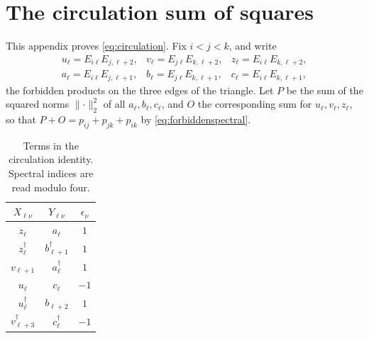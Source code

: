 \documentclass[aps,prl,reprint,superscriptaddress,longbibliography,floatfix,raggedbottom]{revtex4-2}
\newcommand{\norm}[1]{\lVert #1\rVert}
\begin{document}
\section{The circulation sum of squares}\label{app:circulation}

This appendix proves \eqref{eq:circulation}. Fix $i<j<k$, and write
\[
\begin{array}{lll}
u_\ell=E_{i\ell}E_{j,\ell+2},&
v_\ell=E_{j\ell}E_{k,\ell+2},&
z_\ell=E_{i\ell}E_{k,\ell+2},\\[2pt]
a_\ell=E_{i\ell}E_{j,\ell+1},&
b_\ell=E_{j\ell}E_{k,\ell+1},&
c_\ell=E_{i\ell}E_{k,\ell+1},
\end{array}
\]
the forbidden products on the three edges of the triangle. Let $P$ be
the sum of the squared norms $\norm\cdot_2^2$ of all $a_\ell,b_\ell,
c_\ell$, and $O$ the corresponding sum for $u_\ell,v_\ell,z_\ell$, so
that $P+O=p_{ij}+p_{jk}+p_{ik}$ by \eqref{eq:forbiddenspectral}.

\begin{table}[!htbp]
\centering
\caption{Terms in the circulation identity. Spectral indices are read
modulo four.}
\label{tab:circulation}
\renewcommand{\arraystretch}{1.35}
\begin{tabular}{@{}ccc@{}}
\toprule
$X_{\ell\nu}$ & $Y_{\ell\nu}$ & $\epsilon_\nu$\\
\midrule
$z_\ell$ & $a_\ell$ & $1$\\
$z_\ell^\dagger$ & $b_{\ell+1}^\dagger$ & $1$\\
$v_{\ell+1}$ & $a_\ell^\dagger$ & $1$\\
$u_\ell$ & $c_\ell$ & $-1$\\
$u_\ell^\dagger$ & $b_{\ell+2}$ & $1$\\
$v_{\ell+3}^\dagger$ & $c_\ell^\dagger$ & $-1$\\
\bottomrule
\end{tabular}
\end{table}
\end{document}
